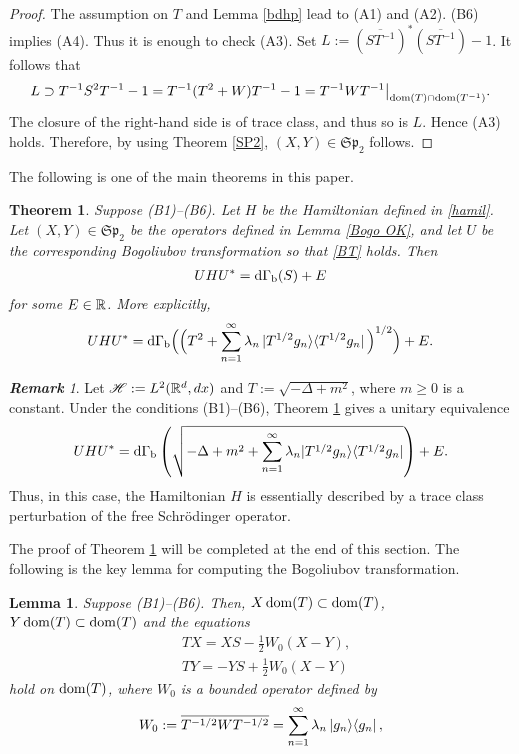 \documentclass[12pt]{article}
\theoremstyle{plain}
\newtheorem{thm}[theorem]{\bf Theorem}
\newtheorem{lem}[theorem]{\bf Lemma}
\numberwithin{equation}{section}
\theoremstyle{remark}
\newtheorem{rem}[theorem]{\bf Remark}
\begin{document}
\begin{proof}
The assumption on $T$ and Lemma \ref{bdhp} lead to (A1) and (A2).
(B6) implies (A4). Thus it is enough to check (A3).
Set $L:=\left(\overline{ST^{-1}}\right)^*\left(\overline{ST^{-1}}\right)-1$.
It follows that
\begin{align*}
L\supset T^{-1}S^2T^{-1}-1=T^{-1}(T^2+W)T^{-1}-1= T^{-1}WT^{-1}\big|_{\mathop{\mathrm{dom}}(T)\cap\mathop{\mathrm{dom}}(T^{-1})}.
\end{align*}
The closure of the right-hand side is of trace class, and thus so is $L$.
Hence (A3) holds.
Therefore, by using Theorem \ref{SP2}, $(X,Y)\in\mathfrak{Sp}_2$ follows.
\end{proof}

The following is one of the main theorems in this paper.
\begin{thm}\label{main}
  Suppose (B1)--(B6). Let $H$ be the Hamiltonian defined in \eqref{hamil}. 
Let $(X,Y)\in\mathfrak{Sp}_2$ be the operators defined in Lemma \ref{Bogo OK}, and 
let $U$ be the corresponding Bogoliubov transformation so that \eqref{BT} holds.
Then
\begin{align}
  UHU^* = \mathrm{d\Gamma_b}(S)+E  \label{ExpDiag}
\end{align}
for some $E\in\mathbb{R}$. More explicitly,
\begin{align*}
  UHU^* = \mathrm{d\Gamma_b}\Big(\Big( T^2+\sum_{n=1}^\infty\lambda_n\ket{T^{1/2}g_n}\!\bra{T^{1/2}g_n}\Big)^{1/2}\Big) + E.
\end{align*}
\end{thm}

\begin{rem}
Let $\mathscr{H}:=L^2(\mathbb{R}^d,dx)$ and $T:=\sqrt{-\Delta+m^2}$, where $m\geq 0$ is a constant.
Under the conditions (B1)--(B6), Theorem \ref{main} gives a unitary equivalence 
\[
UHU^*= \mathrm{d\Gamma_b} \left(\sqrt{-\Delta+m^2+\sum_{n=1}^{\infty}\lambda_n|T^{1/2}g_n\rangle\langle T^{1/2}g_n|}\right) + E.
\]
Thus, in this case, the Hamiltonian $H$ is essentially described by a trace class perturbation of the free Schr\"odinger operator.
\end{rem}


The proof of Theorem \ref{main} will be completed at the end of this section.
The following is the key lemma for computing the Bogoliubov transformation.
\begin{lem}{\label{interP}}
Suppose (B1)--(B6). Then, $X\mathop{\mathrm{dom}}(T)\subset \mathop{\mathrm{dom}}(T)$, 
$Y\mathop{\mathrm{dom}}(T)\subset \mathop{\mathrm{dom}}(T)$ and the equations 
\begin{align*}
  & TX = XS - \frac{1}{2}W_0(X-Y), \\
  & TY = -YS + \frac{1}{2}W_0(X-Y)
\end{align*}
hold on $\mathop{\mathrm{dom}}(T)$, where $W_0$ is a bounded operator defined by
\begin{align}
  W_0 := \overline{T^{-1/2}WT^{-1/2}} = \sum_{n=1}^\infty \lambda_n \ket{g_n} \! \bra{g_n}, \label{defW0}
\end{align}
\end{lem}
\end{document}
